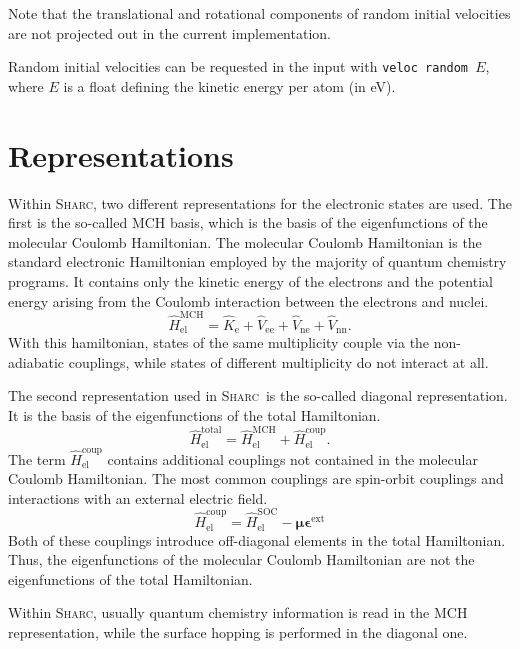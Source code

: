 \documentclass[a4paper,11pt,DIV=15,openany,twoside=false]{scrbook}
\newcommand{\sharc}{\textsc{Sharc}}
\newcommand{\ttt}[1]{\texttt{#1}}
\begin{document}
Note that the translational and rotational components of random initial velocities are not projected out in the current implementation.

Random initial velocities can be requested in the input with \ttt{veloc random $E$}, where $E$ is a float defining the kinetic energy per atom (in eV).


\section{Representations}

Within \sharc, two different representations for the electronic states are used. The first is the so-called MCH basis, which is the basis of the eigenfunctions of the molecular Coulomb Hamiltonian. The molecular Coulomb Hamiltonian is the standard electronic Hamiltonian employed by the majority of quantum chemistry programs. It contains only the kinetic energy of the electrons and the potential energy arising from the Coulomb interaction between the electrons and nuclei.
\begin{equation}
  \hat{H}_{\text{el}}^{\text{MCH}}
  =\hat{K}_{\text{e}}
  +\hat{V}_{\text{ee}}
  +\hat{V}_{\text{ne}}
  +\hat{V}_{\text{nn}}.
\end{equation}
With this hamiltonian, states of the same multiplicity couple via the non-adiabatic couplings, while states of different multiplicity do not interact at all. 

The second representation used in \sharc\ is the so-called diagonal representation. It is the basis of the eigenfunctions of the total Hamiltonian.
\begin{equation}
  \hat{H}_{\text{el}}^{\text{total}}
  =\hat{H}_{\text{el}}^{\text{MCH}}
  +\hat{H}_{\text{el}}^{\text{coup}}.
\end{equation}
The term $\hat{H}_{\text{el}}^{\text{coup}}$ contains additional couplings not contained in the molecular Coulomb Hamiltonian. The most common couplings are spin-orbit couplings and interactions with an external electric field.
\begin{equation}
  \hat{H}_{\text{el}}^{\text{coup}}=\hat{H}_{\text{el}}^{\text{SOC}}-\boldsymbol{\mu}\boldsymbol{\epsilon}^{\text{ext}}
\end{equation}
Both of these couplings introduce off-diagonal elements in the total Hamiltonian. Thus, the eigenfunctions of the molecular Coulomb Hamiltonian are not the eigenfunctions of the total Hamiltonian. 

Within \sharc, usually quantum chemistry information is read in the MCH representation, while the surface hopping is performed in the diagonal one.
\end{document}
